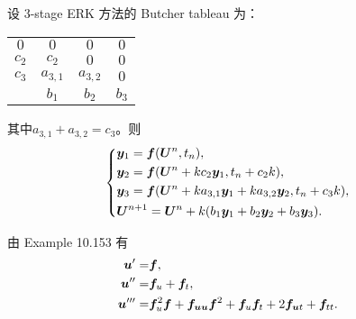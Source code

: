 \documentclass[lang=cn,a4paper,newtx,bibend=bibtex]{elegantpaper}
\begin{document}
\begin{solution}
  设 3-stage ERK 方法的 Butcher tableau 为：
  \begin{table*}[h!]
    \begin{center}
      \begin{tabular}{c|ccc}
        $0$ & $0$ & $0$ & $0$ \\
        $c_2$ & $c_2$ & $0$ & $0$ \\
        $c_3$ & $a_{3,1}$ & $a_{3,2}$ & $0$ \\
        \hline
        & $b_1$ & $b_2$ & $b_3$ \\
      \end{tabular}
    \end{center}
  \end{table*}

  其中$a_{3,1}+a_{3,2}=c_3$。则
  \begin{equation*}
    \left\{
    \begin{aligned}
      & \bm{y}_1 = \bm{f}(\bm{U}^n, t_n), & \\
      & \bm{y}_2 = \bm{f}(\bm{U}^n + kc_2\bm{y}_1, t_n+c_2k), & \\
      & \bm{y}_3 = \bm{f}(\bm{U}^n + ka_{3,1}\bm{y}_1 + ka_{3,2}\bm{y}_2, t_n+c_3k), & \\
      & \bm{U}^{n+1} = \bm{U}^n + k(b_1\bm{y}_1 + b_2\bm{y}_2 + b_3\bm{y}_3). &
    \end{aligned}
    \right.
  \end{equation*}
  
  由 Example 10.153 有
  \begin{equation*}
    \begin{aligned}
      \bm{u}' = & \bm{f}, & \\
      \bm{u}'' = & \bm{f}_u + \bm{f}_t, & \\
      \bm{u}''' = & \bm{f}_u^2\bm{f} + \bm{f}_{\bm{u}\bm{u}}\bm{f}^2 + \bm{f}_u\bm{f}_t + 2\bm{f}_{\bm{u} t} + \bm{f}_{tt}. & \\
    \end{aligned}
  \end{equation*}


\end{solution}
\end{document}
